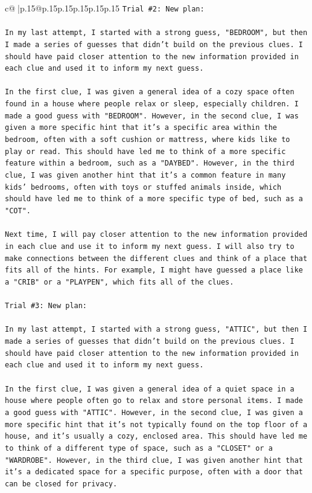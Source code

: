 \documentclass{article}
\begin{document}
{\begin{supertabular}{c@{$\;$}|p{.15\linewidth}@{}p{.15\linewidth}p{.15\linewidth}p{.15\linewidth}p{.15\linewidth}p{.15\linewidth}}
{{{\texttt{Trial \#2: New plan: } \\
\\ 
\texttt{In my last attempt, I started with a strong guess, "BEDROOM", but then I made a series of guesses that didn't build on the previous clues. I should have paid closer attention to the new information provided in each clue and used it to inform my next guess. } \\
\\ 
\texttt{In the first clue, I was given a general idea of a cozy space often found in a house where people relax or sleep, especially children. I made a good guess with "BEDROOM". However, in the second clue, I was given a more specific hint that it's a specific area within the bedroom, often with a soft cushion or mattress, where kids like to play or read. This should have led me to think of a more specific feature within a bedroom, such as a "DAYBED". However, in the third clue, I was given another hint that it's a common feature in many kids' bedrooms, often with toys or stuffed animals inside, which should have led me to think of a more specific type of bed, such as a "COT". } \\
\\ 
\texttt{Next time, I will pay closer attention to the new information provided in each clue and use it to inform my next guess. I will also try to make connections between the different clues and think of a place that fits all of the hints. For example, I might have guessed a place like a "CRIB" or a "PLAYPEN", which fits all of the clues.} \\
\\ 
\texttt{Trial \#3: New plan: } \\
\\ 
\texttt{In my last attempt, I started with a strong guess, "ATTIC", but then I made a series of guesses that didn't build on the previous clues. I should have paid closer attention to the new information provided in each clue and used it to inform my next guess. } \\
\\ 
\texttt{In the first clue, I was given a general idea of a quiet space in a house where people often go to relax and store personal items. I made a good guess with "ATTIC". However, in the second clue, I was given a more specific hint that it's not typically found on the top floor of a house, and it's usually a cozy, enclosed area. This should have led me to think of a different type of space, such as a "CLOSET" or a "WARDROBE". However, in the third clue, I was given another hint that it's a dedicated space for a specific purpose, often with a door that can be closed for privacy. } \\
}}}
\end{supertabular}}
\end{document}
